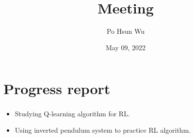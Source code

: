 \documentclass{beamer}
\date{May 09, 2022}
\title{Meeting}
\author{Po Hsun Wu}
\begin{document}
    \maketitle

    \section*{Progress report}
    \begin{frame}
        \frametitle{\secname}

        \begin{itemize}
            \item Studying Q-learning algorithm for RL.
            \item Using inverted pendulum system to practice RL algorithm.
        \end{itemize}

    \end{frame}
\end{document}
